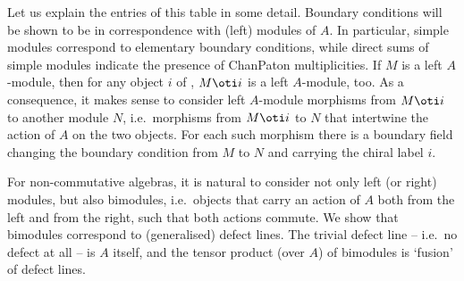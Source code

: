 \begin{center} 
\end{center}

Let us explain the entries of this table in some detail. Boundary 
conditions will be shown to be in correspondence with (left) modules of $A$.
In particular, simple modules correspond to elementary boundary conditions,
while direct sums of simple modules indicate the presence of Chan\hy Paton
multiplicities. If $M$
is a left $A$-module, then for any object $i$ of \calc, $M\oti i$ is a left 
$A$-module, too. As a consequence, it makes sense to consider 
left $A$-module morphisms from $M\oti i$ to another module $N$,
i.e.\ morphisms from $M\oti i$ to $N$ that intertwine the action of $A$ 
on the two objects. For each such morphism there is a boundary field
changing the boundary condition from $M$ to $N$ and carrying the chiral
label $i$.

For non-commutative algebras, it is natural to consider not only left
(or right) modules, but also bimodules, i.e.\ objects that carry an action 
of $A$ both from the left and from the right, such that both actions commute.
We show that bimodules correspond to (generalised) defect lines. The 
trivial defect line -- i.e.\ no defect at all -- is $A$ itself, and the
tensor product (over $A$) of bimodules is `fusion' of defect lines. 

